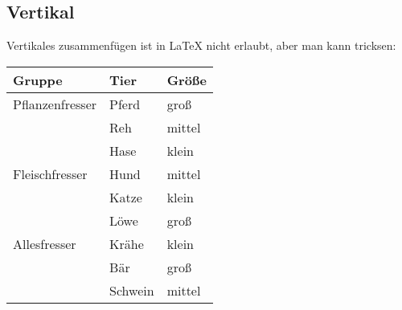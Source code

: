 \documentclass[a4paper]{article}
\begin{document}
\subsection{Vertikal}

Vertikales zusammenfügen ist in \LaTeX{} nicht erlaubt, aber man kann tricksen:

\begin{tabular}{lll}
    \toprule
    Gruppe          & Tier    & Größe  \\
    \midrule
    Pflanzenfresser & Pferd   & groß   \\
                    & Reh     & mittel \\
                    & Hase    & klein  \\
    \addlinespace
    Fleischfresser  & Hund    & mittel \\
                    & Katze   & klein  \\
                    & Löwe    & groß   \\
    \addlinespace
    Allesfresser    & Krähe   & klein  \\
                    & Bär     & groß   \\
                    & Schwein & mittel \\
    \bottomrule
\end{tabular}
\end{document}
